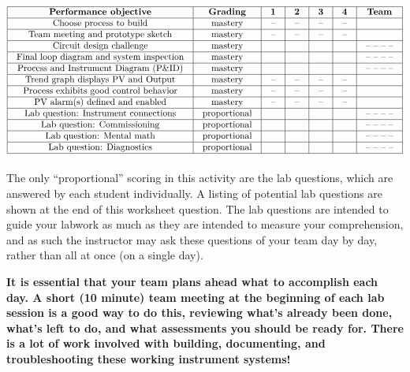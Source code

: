 

$$\vbox{\offinterlineskip
\halign{\strut
\vrule \quad\hfil # \ \hfil & 
\vrule \quad\hfil # \ \hfil & 
\vrule \quad\hfil # \ \hfil & 
\vrule \quad\hfil # \ \hfil & 
\vrule \quad\hfil # \ \hfil & 
\vrule \quad\hfil # \ \hfil & 
\vrule \quad\hfil # \ \hfil \vrule \cr
\noalign{\hrule}
%
{\bf Performance objective} & {\bf Grading} & {\bf 1} & {\bf 2} & {\bf 3} & {\bf 4} & {\bf Team} \cr
%
\noalign{\hrule}
%
Choose process to build & mastery & -- & -- & -- & -- & \cr
%
\noalign{\hrule}
%
Team meeting and prototype sketch & mastery & -- & -- & -- & -- & \cr
%
\noalign{\hrule}
%
Circuit design challenge & mastery & & & & & -- -- -- -- \cr
%
\noalign{\hrule}
%
Final loop diagram and system inspection & mastery & & & & & -- -- -- -- \cr
%
\noalign{\hrule}
%
Process and Instrument Diagram (P\&ID) & mastery & & & & & -- -- -- -- \cr
%
\noalign{\hrule}
%
Trend graph displays PV and Output & mastery & -- & -- & -- & -- &  \cr
%
\noalign{\hrule}
%
Process exhibits good control behavior & mastery & -- & -- & -- & -- &  \cr
%
\noalign{\hrule}
%
PV alarm(s) defined and enabled & mastery & -- & -- & -- & -- &  \cr
%
\noalign{\hrule}
%
Lab question: Instrument connections & proportional &  &  &  &  & -- -- -- -- \cr
%
\noalign{\hrule}
%
Lab question: Commissioning & proportional &  &  &  &  & -- -- -- -- \cr
%
\noalign{\hrule}
%
Lab question: Mental math & proportional &  &  &  &  & -- -- -- -- \cr
%
\noalign{\hrule}
%
Lab question: Diagnostics & proportional &  &  &  &  & -- -- -- -- \cr
%
\noalign{\hrule}
} %
}$$ %

The only ``proportional'' scoring in this activity are the lab questions, which are answered by each student individually.  A listing of potential lab questions are shown at the end of this worksheet question.  The lab questions are intended to guide your labwork as much as they are intended to measure your comprehension, and as such the instructor may ask these questions of your team day by day, rather than all at once (on a single day).

\vskip 10pt

{\bf It is essential that your team plans ahead what to accomplish each day.  A short (10 minute) team meeting at the beginning of each lab session is a good way to do this, reviewing what's already been done, what's left to do, and what assessments you should be ready for.  There is a lot of work involved with building, documenting, and troubleshooting these working instrument systems!}

